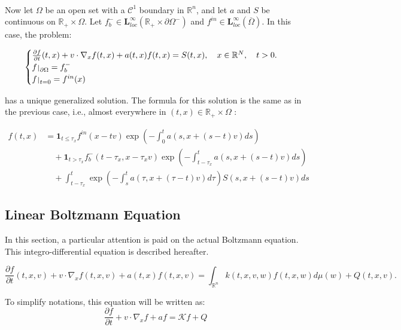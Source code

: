 \documentclass[a4paper, 11pt]{article}
\def\restriction#1#2{\mathchoice
	{\setbox1\hbox{${\displaystyle #1}_{\scriptstyle #2}$}
		\restrictionaux{#1}{#2}}
	{\setbox1\hbox{${\textstyle #1}_{\scriptstyle #2}$}
		\restrictionaux{#1}{#2}}
	{\setbox1\hbox{${\scriptstyle #1}_{\scriptscriptstyle #2}$}
		\restrictionaux{#1}{#2}}
	{\setbox1\hbox{${\scriptscriptstyle #1}_{\scriptscriptstyle #2}$}
		\restrictionaux{#1}{#2}}}
\def\restrictionaux#1#2{{#1\,\smash{\vrule height .8\ht1 depth .85\dp1}}_{\,#2}}
\begin{document}
\paragraph{}
Now let $\Omega$ be an open set with a $\mathcal{C}^1$ boundary in $\mathbb{R}^n$, and let $a$ and $S$ be continuous on $\mathbb{R}_+ \times \Omega$. Let $f_b^- \in \mathbf{L}_{loc}^{\infty}(\mathbb{R}_+ \times \partial \Omega^-)$ and $f^{in} \in \mathbf{L}_{loc}^{\infty}(\overline{\Omega})$.
\medbreak
In this case, the problem:

\[
\begin{cases}
\frac{\partial f}{\partial t}(t,x)+v \cdot \nabla_x f(t,x)+ a(t,x)f(t,x)=S(t,x), \quad x \in \mathbb{R}^N, \quad t>0.\\
\restriction{f}{\partial \Omega}= f_b^-\\
\restriction{f}{t=0}= f^{in}(x)
\end{cases}
\]

has a unique generalized solution. The formula for this solution is the same as in the previous case, i.e., almost everywhere in $(t,x) \in \mathbb{R}_+ \times \Omega$ :

\[
\boxed{
	\begin{aligned}
	f(t,x) &= \mathbf{1}_{t \leq \tau_x} f^{in} (x-tv) \exp\left(-\int_0^t a(s,x+(s-t)v)ds\right) \\
	&\quad + \mathbf{1}_{t > \tau_x} f_b^- (t-\tau_x,x-\tau_x v) \exp\left(-\int_{t-\tau_x}^t a(s,x+(s-t)v)ds\right) \\
	&\quad + \int_{t-\tau_x}^t \exp\left(-\int_{s}^{t}a(\tau,x+(\tau-t)v)d\tau\right) S(s,x+(s-t)v)ds
	\end{aligned}}
\]


\subsection{Linear Boltzmann Equation}

In this section, a particular attention is paid on the actual Boltzmann equation. This integro-differential equation is described hereafter.

\begin{equation} \label{Boltzmann}
\frac{\partial f}{\partial t}(t,x,v)+v \cdot \nabla_x f(t,x,v) + a(t,x)f(t,x,v) = \int_{\mathbb{R}^n}k(t,x,v,w)f(t,x,w)d\mu(w)+Q(t,x,v).
\end{equation}

To simplify notations, this equation will be written as: 
\[ \frac{\partial f}{\partial t}+v \cdot \nabla_x f +af =   \mathcal{K} f +Q  \]
\end{document}
